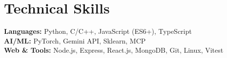 \section{Technical Skills}
 \begin{itemize}[leftmargin=0.15in, label={}]
    \small{
        \item{
            \textbf{Languages: }{Python, C/C++, JavaScript (ES6+), TypeScript} \\
            \textbf{AI/ML: }{PyTorch, Gemini API, Sklearn, MCP} \\
            \textbf{Web \& Tools: }{Node.js, Express, React.js, MongoDB, Git, Linux, Vitest}
        }
    }
 \end{itemize}
